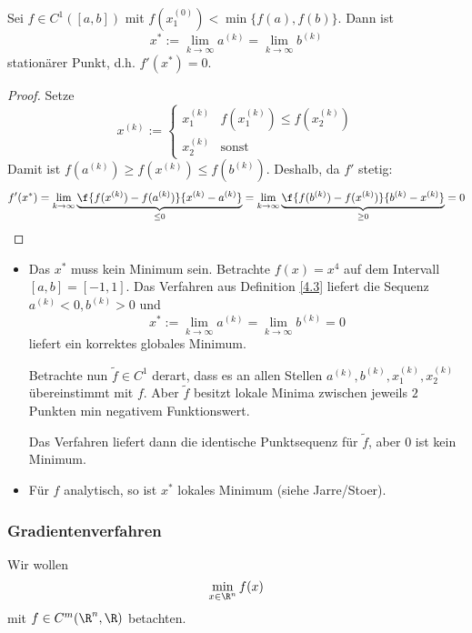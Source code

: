 \documentclass[11pt]{scrartcl}
\begin{document}
\begin{st} \label{4.5}
	Sei $f\in C^1([a,b])$ mit $f(x_1^{(0)}) < \min\{f(a),f(b)\}$.
	Dann ist
	\[
		x^* := \lim_{k\to \infty} a^{(k)} = \lim_{k\to \infty}b^{(k)}
	\]
	stationärer Punkt, d.h. $f'(x^*) = 0$.
	\begin{proof}
		Setze 
		\[
			x^{(k)} := \begin{cases}
				x_1^{(k)} & f(x_1^{(k)}) \le f(x_2^{(k)}) \\
				x_2^{(k)} & \text{sonst}
			\end{cases}
		\]
		Damit ist $f(a^{(k)}) \ge f(x^{(k)}) \le f(b^{(k)})$.
		Deshalb, da $f'$ stetig:
		\[
			f'(x^*) = \lim_{k\to \infty} \underbrace{\f {f(x^{(k)})-f(a^{(k)})}{x^{(k)}-a^{(k)}}}_{\le 0} = \lim_{k\to \infty} \underbrace{\f {f(b^{(k)})-f(x^{(k)})}{b^{(k)}-x^{(k)}}}_{\ge 0} = 0
		\]
	\end{proof}
	\begin{note}

		\begin{itemize}
			\item
				Das $x^*$ muss kein Minimum sein.
				Betrachte $f(x) = x^4$ auf dem Intervall $[a,b] = [-1,1]$.
				Das Verfahren aus Definition \ref{4.3} liefert die Sequenz $a^{(k)} < 0, b^{(k)} > 0$ und
				\[
					x^* := \lim_{k\to \infty}a^{(k)} = \lim_{k\to \infty} b^{(k)} = 0
				\]
				liefert ein korrektes globales Minimum.

				Betrachte nun $\tilde f\in C^1$ derart, dass es an allen Stellen $a^{(k)},b^{(k)},x_1^{(k)},x_2^{(k)}$ übereinstimmt mit $f$.
				Aber $\tilde f$ besitzt lokale Minima zwischen jeweils $2$ Punkten min negativem Funktionswert.

				Das Verfahren liefert dann die identische Punktsequenz für $\tilde f$, aber $0$ ist kein Minimum.
			\item
				Für $f$ analytisch, so ist $x^*$ lokales Minimum (siehe Jarre/Stoer).
		\end{itemize}
	\end{note}
\end{st}


\subsubsection{Gradientenverfahren}

Wir wollen
\[
	\min_{x\in \R^n} f(x)
\]
mit $f \in C^m (\R^n, \R)$ betachten.
\end{document}
